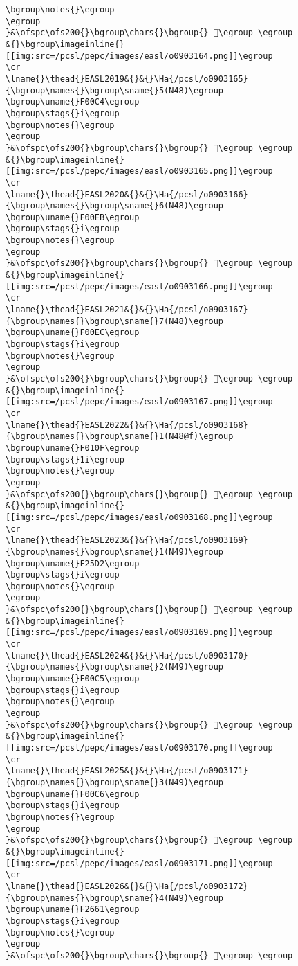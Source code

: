\begin{verbatim}
\bgroup\notes{}\egroup
\egroup
}&\ofspc\ofs200{}\bgroup\chars{}\bgroup{} 󲙠\egroup \egroup
&{}\bgroup\imageinline{}[[img:src=/pcsl/pepc/images/easl/o0903164.png]]\egroup
\cr
\lname{}\thead{}EASL2019&{}&{}\Ha{/pcsl/o0903165}{\bgroup\names{}\bgroup\sname{}5(N48)\egroup
\bgroup\uname{}F00C4\egroup
\bgroup\stags{}i\egroup
\bgroup\notes{}\egroup
\egroup
}&\ofspc\ofs200{}\bgroup\chars{}\bgroup{} 󰃄\egroup \egroup
&{}\bgroup\imageinline{}[[img:src=/pcsl/pepc/images/easl/o0903165.png]]\egroup
\cr
\lname{}\thead{}EASL2020&{}&{}\Ha{/pcsl/o0903166}{\bgroup\names{}\bgroup\sname{}6(N48)\egroup
\bgroup\uname{}F00EB\egroup
\bgroup\stags{}i\egroup
\bgroup\notes{}\egroup
\egroup
}&\ofspc\ofs200{}\bgroup\chars{}\bgroup{} 󰃫\egroup \egroup
&{}\bgroup\imageinline{}[[img:src=/pcsl/pepc/images/easl/o0903166.png]]\egroup
\cr
\lname{}\thead{}EASL2021&{}&{}\Ha{/pcsl/o0903167}{\bgroup\names{}\bgroup\sname{}7(N48)\egroup
\bgroup\uname{}F00EC\egroup
\bgroup\stags{}i\egroup
\bgroup\notes{}\egroup
\egroup
}&\ofspc\ofs200{}\bgroup\chars{}\bgroup{} 󰃬\egroup \egroup
&{}\bgroup\imageinline{}[[img:src=/pcsl/pepc/images/easl/o0903167.png]]\egroup
\cr
\lname{}\thead{}EASL2022&{}&{}\Ha{/pcsl/o0903168}{\bgroup\names{}\bgroup\sname{}1(N48@f)\egroup
\bgroup\uname{}F010F\egroup
\bgroup\stags{}1i\egroup
\bgroup\notes{}\egroup
\egroup
}&\ofspc\ofs200{}\bgroup\chars{}\bgroup{} 󰄏\egroup \egroup
&{}\bgroup\imageinline{}[[img:src=/pcsl/pepc/images/easl/o0903168.png]]\egroup
\cr
\lname{}\thead{}EASL2023&{}&{}\Ha{/pcsl/o0903169}{\bgroup\names{}\bgroup\sname{}1(N49)\egroup
\bgroup\uname{}F25D2\egroup
\bgroup\stags{}i\egroup
\bgroup\notes{}\egroup
\egroup
}&\ofspc\ofs200{}\bgroup\chars{}\bgroup{} 󲗒\egroup \egroup
&{}\bgroup\imageinline{}[[img:src=/pcsl/pepc/images/easl/o0903169.png]]\egroup
\cr
\lname{}\thead{}EASL2024&{}&{}\Ha{/pcsl/o0903170}{\bgroup\names{}\bgroup\sname{}2(N49)\egroup
\bgroup\uname{}F00C5\egroup
\bgroup\stags{}i\egroup
\bgroup\notes{}\egroup
\egroup
}&\ofspc\ofs200{}\bgroup\chars{}\bgroup{} 󰃅\egroup \egroup
&{}\bgroup\imageinline{}[[img:src=/pcsl/pepc/images/easl/o0903170.png]]\egroup
\cr
\lname{}\thead{}EASL2025&{}&{}\Ha{/pcsl/o0903171}{\bgroup\names{}\bgroup\sname{}3(N49)\egroup
\bgroup\uname{}F00C6\egroup
\bgroup\stags{}i\egroup
\bgroup\notes{}\egroup
\egroup
}&\ofspc\ofs200{}\bgroup\chars{}\bgroup{} 󰃆\egroup \egroup
&{}\bgroup\imageinline{}[[img:src=/pcsl/pepc/images/easl/o0903171.png]]\egroup
\cr
\lname{}\thead{}EASL2026&{}&{}\Ha{/pcsl/o0903172}{\bgroup\names{}\bgroup\sname{}4(N49)\egroup
\bgroup\uname{}F2661\egroup
\bgroup\stags{}i\egroup
\bgroup\notes{}\egroup
\egroup
}&\ofspc\ofs200{}\bgroup\chars{}\bgroup{} 󲙡\egroup \egroup

\end{verbatim}
